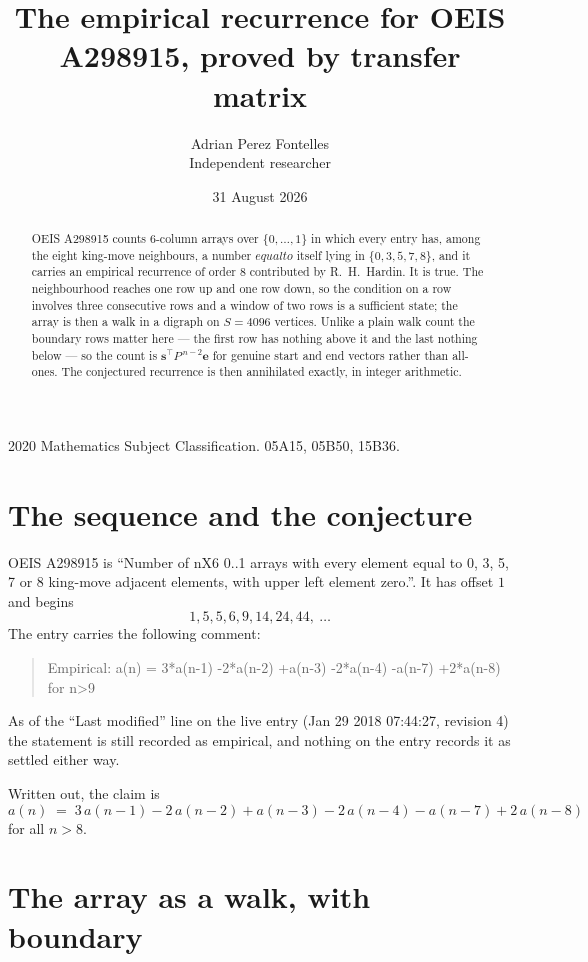 \documentclass[11pt,a4paper]{article}
\title{The empirical recurrence for OEIS A298915, proved by transfer matrix}
\author{Adrian Perez Fontelles\\ \small Independent researcher}
\date{31 August 2026}
\theoremstyle{plain}
\theoremstyle{definition}
\begin{document}
\maketitle

\begin{abstract}
OEIS A298915 counts $6$-column arrays over $\{0,\dots,1\}$ in which every entry has,
among the eight king-move neighbours, a number $equal to$ itself lying in $\{0,3,5,7,8\}$, and it carries an empirical
recurrence of order $8$ contributed by R.~H.~Hardin. It is true. The neighbourhood
reaches one row up and one row down, so the condition on a row involves three consecutive
rows and a window of two rows is a sufficient state; the array is then a walk in a digraph
on $S=4096$ vertices. Unlike a plain walk count the boundary rows matter here --- the first
row has nothing above it and the last nothing below --- so the count is
$\mathbf{s}^{\!\top}P^{\,n-2}\mathbf{e}$ for genuine start and end vectors rather than
all-ones. The conjectured recurrence is then annihilated exactly, in integer arithmetic.
\end{abstract}

\noindent\small 2020 Mathematics Subject Classification. 05A15, 05B50, 15B36.\normalsize

\section{The sequence and the conjecture}

OEIS A298915 is ``Number of nX6 0..1 arrays with every element equal to 0, 3, 5, 7 or 8 king-move adjacent elements, with upper left element zero.''. It has offset
$1$ and begins
\[
1, 5, 5, 6, 9, 14, 24, 44,\ \dots
\]
The entry carries the following comment:
\begin{quote}\small
Empirical: a(n) = 3*a(n-1) -2*a(n-2) +a(n-3) -2*a(n-4) -a(n-7) +2*a(n-8) for n>9
\end{quote}
As of the ``Last modified'' line on the live entry (Jan 29 2018 07:44:27, revision
4) the statement is still recorded as empirical, and nothing on the entry
records it as settled either way.

Written out, the claim is
\begin{equation}\label{eq:conj}
a(n)\;=\;3\,a(n-1) - 2\,a(n-2) + a(n-3) - 2\,a(n-4) - a(n-7) + 2\,a(n-8)
\end{equation}
for all $n>8$.

\section{The array as a walk, with boundary}
\end{document}

